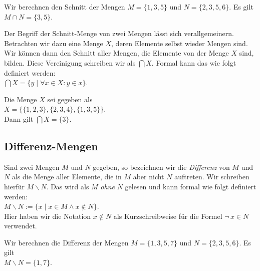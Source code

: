 \example
Wir berechnen den Schnitt der  Mengen $M = \{ 1, 3, 5 \}$ und $N = \{ 2, 3, 5, 6 \}$.  Es gilt
\\[0.2cm]
\hspace*{1.3cm} $M \cap N = \{ 3, 5 \}$.
\eox
\vspace{0.2cm}

\noindent
Der Begriff der Schnitt-Menge von zwei Mengen l\"{a}sst sich verallgemeinern.  Betrachten
wir dazu eine Menge $X$, deren Elemente selbst wieder Mengen sind.  Wir k\"{o}nnen dann den
Schnitt aller Mengen, die Elemente von der Menge $X$ sind, bilden.  Diese Vereinigung
schreiben wir als $\bigcap X$.  Formal kann das wie folgt definiert werden: \\[0.2cm]
\hspace*{1.3cm} $\bigcap X = \{ y \;|\; \forall x \in X: y \in x \}$.

\example
Die Menge $X$ sei gegeben als
\\[0.2cm]
\hspace*{1.3cm}
$X = \bigl\{ \{ 1, 2, 3 \}, \{ 2, 3, 4 \}, \{ 1, 3, 5 \} \bigr\}$. 
\\[0.2cm]
Dann gilt $\bigcap X = \{ 3 \}$.  \eox

\subsection{Differenz-Mengen}
 Sind zwei Mengen $M$ und $N$ gegeben, so bezeichnen wir die \emph{Differenz} von
 $M$ und $N$ als die Menge aller Elemente, die in $M$ aber nicht $N$
 auftreten.  Wir schreiben hierf\"{u}r $M \backslash N$.  Das wird als $M$ \emph{ohne} $N$
gelesen und kann formal wie folgt definiert werden: 
\\[0.2cm]
\hspace*{1.3cm} $M \backslash N := \{ x \mid x \in M \wedge x \not\in N \}$. 
\\[0.2cm]
Hier haben wir die Notation $x \not\in N$ als Kurzschreibweise f\"{u}r die Formel $\neg\, x \in N$ 
verwendet.
\pagebreak


\example
Wir berechnen die Differenz der Mengen $M = \{ 1, 3, 5, 7 \}$ und $N = \{ 2, 3, 5, 6 \}$.  Es gilt
\\[0.2cm]
\hspace*{1.3cm}
$M \backslash N = \{ 1, 7 \}$. \eox


